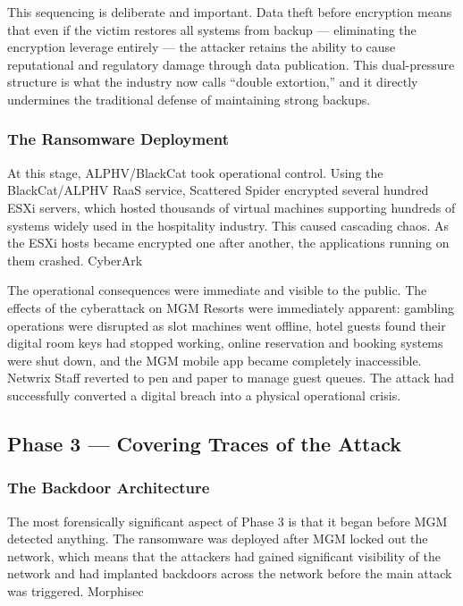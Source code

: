 This sequencing is deliberate and important. Data theft before encryption means that even if the victim restores all systems from backup — eliminating the encryption leverage entirely — the attacker retains the ability to cause reputational and regulatory damage through data publication. This dual-pressure structure is what the industry now calls ``double extortion,'' and it directly undermines the traditional defense of maintaining strong backups.

\subsubsection{The Ransomware Deployment}

At this stage, ALPHV/BlackCat took operational control. Using the BlackCat/ALPHV RaaS service, Scattered Spider encrypted several hundred ESXi servers, which hosted thousands of virtual machines supporting hundreds of systems widely used in the hospitality industry. This caused cascading chaos. As the ESXi hosts became encrypted one after another, the applications running on them crashed. CyberArk

The operational consequences were immediate and visible to the public. The effects of the cyberattack on MGM Resorts were immediately apparent: gambling operations were disrupted as slot machines went offline, hotel guests found their digital room keys had stopped working, online reservation and booking systems were shut down, and the MGM mobile app became completely inaccessible. Netwrix Staff reverted to pen and paper to manage guest queues. The attack had successfully converted a digital breach into a physical operational crisis.

\subsection{Phase 3 — Covering Traces of the Attack}

\subsubsection{The Backdoor Architecture}

The most forensically significant aspect of Phase 3 is that it began before MGM detected anything. The ransomware was deployed after MGM locked out the network, which means that the attackers had gained significant visibility of the network and had implanted backdoors across the network before the main attack was triggered. Morphisec

